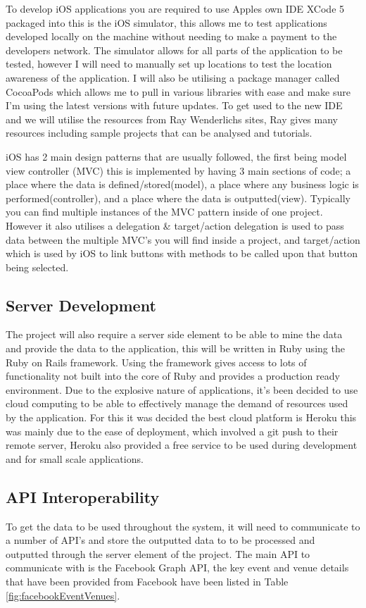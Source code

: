 	To develop iOS applications you are required to use Apples own IDE XCode 5 packaged into this is the iOS simulator, this allows me to test applications developed locally on the machine without needing to make a payment to the developers network. The simulator allows for all parts of the application to be tested, however I will need to manually set up locations to test the location awareness of the application. I will also be utilising a package manager called CocoaPods \cite{cocoapods} which allows me to pull in various libraries with ease and make sure I'm using the latest versions with future updates. To get used to the new IDE and we will utilise the resources from Ray Wenderlichs sites\cite{raywender}, Ray gives many resources including sample projects that can be analysed and tutorials.  

	iOS has 2 main design patterns that are usually followed, the first being model view controller (MVC) this is implemented by having 3 main sections of code; a place where the data is defined/stored(model), a place where any business logic is performed(controller), and a place where the data is outputted(view). Typically you can find multiple instances of the MVC pattern inside of one project. However it also utilises a delegation \& target/action delegation is used to pass data between the multiple MVC's you will find inside a project, and target/action which is used by iOS to link buttons with methods to be called upon that button being selected.

	\subsection{Server Development}

	The project will also require a server side element to be able to mine the data and provide the data to the application, this will be written in Ruby using the Ruby on Rails framework. Using the framework gives access to lots of functionality not built into the core of Ruby and provides a production ready environment. Due to the explosive nature of applications, it's been decided to use cloud computing to be able to effectively manage the demand of resources used by the application. For this it was decided the best cloud platform is Heroku\cite{heroku} this was mainly due to the ease of deployment, which involved a git push to their remote server, Heroku also provided a free service to be used during development and for small scale applications. 


	\subsection{API Interoperability}
		To get the data to be used throughout the system, it will need to communicate to a number of API's and store the outputted data to to be processed and outputted through the server element of the project. The main API to communicate with is the Facebook Graph API\cite{facebookapi}, the key event and venue details that have been provided from Facebook have been listed in Table \ref{fig:facebookEventVenues}. 
		
